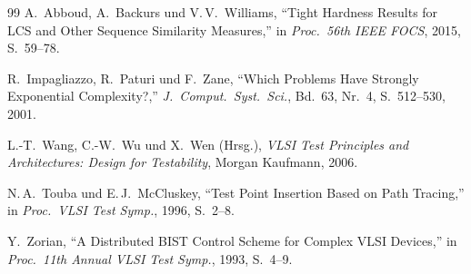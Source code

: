 ﻿\documentclass[a4paper,12pt]{article}
\theoremstyle{definition}
\begin{document}
\begin{thebibliography}{99}
A.~Abboud, A.~Backurs und V.\,V.~Williams, ``Tight Hardness Results
for LCS and Other Sequence Similarity Measures,'' in
\textit{Proc.\ 56th IEEE FOCS}, 2015, S.~59--78.

R.~Impagliazzo, R.~Paturi und F.~Zane, ``Which Problems Have Strongly
Exponential Complexity?,'' \textit{J.~Comput.\ Syst.\ Sci.},
Bd.~63, Nr.~4, S.~512--530, 2001.

L.-T.~Wang, C.-W.~Wu und X.~Wen (Hrsg.),
\textit{VLSI Test Principles and Architectures: Design for Testability},
Morgan Kaufmann, 2006.

N.\,A.~Touba und E.\,J.~McCluskey, ``Test Point Insertion Based on
Path Tracing,'' in \textit{Proc.\ VLSI Test Symp.}, 1996, S.~2--8.

Y.~Zorian, ``A Distributed BIST Control Scheme for Complex VLSI
Devices,'' in \textit{Proc.\ 11th Annual VLSI Test Symp.}, 1993,
S.~4--9.

\end{thebibliography}
\end{document}

